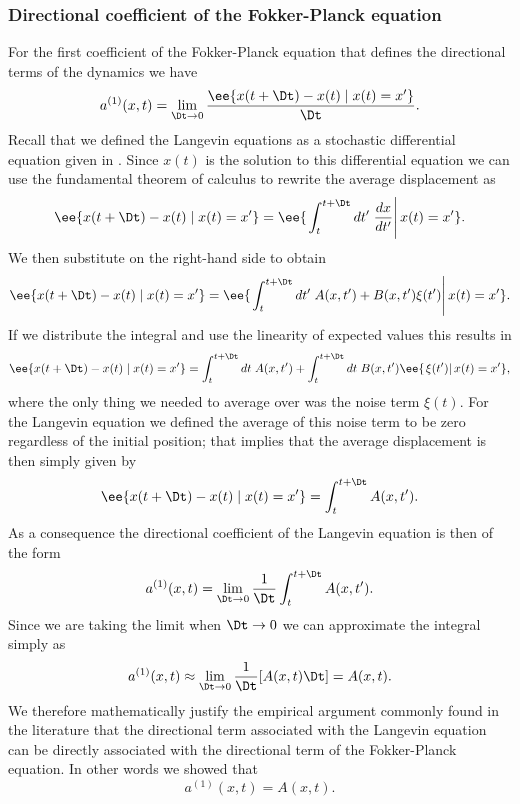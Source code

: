 \subsubsection{Directional coefficient of the Fokker-Planck equation}

For the first coefficient of the Fokker-Planck equation that defines the
directional terms of the dynamics we have
\begin{equation}
    a^{(1)}(x, t) = \lim_{\Dt \rightarrow 0}
    {\ee{x(t + \Dt) - x(t) \mid x(t) = x'} \over \Dt}.
\end{equation}
Recall that we defined the Langevin equations as a stochastic differential
equation given in . Since $x(t)$ is the solution to this
differential equation we can use the fundamental theorem of calculus to rewrite
the average displacement as
\begin{equation}
    \ee{x(t + \Dt) - x(t) \mid x(t) = x'} =
    \ee{\left. \int_t^{t + \Dt} dt'\; {dx \over dt'} \right\vert x(t) = x'}.
\end{equation}
We then substitute  on the right-hand side to obtain
\begin{equation}
    \ee{x(t + \Dt) - x(t) \mid x(t) = x'} =
    \ee{\left.\int_t^{t + \Dt} dt'\; A(x, t') + B(x, t') \xi(t')\right\vert 
    x(t) = x'}.
\end{equation}
If we distribute the integral and use the linearity of expected values this
results in
\begin{equation}
    \ee{x(t + \Dt) - x(t) \mid x(t) = x'} =
    \int_t^{t + \Dt} dt\; A(x, t') + 
    \int_t^{t + \Dt} dt\; B(x, t') \ee{ \left.\xi(t') \right\vert x(t) = x'},
\end{equation}
where the only thing we needed to average over was the noise term $\xi(t)$. For
the Langevin equation we defined the average of this noise term to be zero
regardless of the initial position; that implies that the average displacement
is then simply given by
\begin{equation}
    \ee{x(t + \Dt) - x(t) \mid x(t) = x'} =
    \int_t^{t + \Dt} A(x, t').
\end{equation}
As a consequence the directional coefficient of the Langevin equation is then
of the form
\begin{equation}
    a^{(1)}(x, t) = \lim_{\Dt \rightarrow 0} {1 \over \Dt}
    \int_t^{t + \Dt} A(x, t').
\end{equation}
Since we are taking the limit when $\Dt \rightarrow 0$ we can approximate the
integral simply as
\begin{equation}
    a^{(1)}(x, t) \approx \lim_{\Dt \rightarrow 0}{1 \over \Dt} [A(x, t) \Dt] =
    A(x, t).
\end{equation}
We therefore mathematically justify the empirical argument commonly found in
the literature that the directional term associated with the Langevin equation
can be directly associated with the directional term of the Fokker-Planck
equation. In other words we showed that
\begin{equation}
    a^{(1)}(x, t) = A(x, t).
\end{equation}

